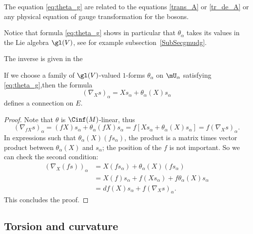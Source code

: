 \begin{normaltext}
    The equation \eqref{eq:theta_g} are related to the equations \eqref{trans_A} or \eqref{tr_de_A} or any physical equation of gauge transformation for the bosons.
\end{normaltext}

\begin{normaltext}
    Notice that formula \eqref{eq:theta_g} shows in particular that $\theta_{\alpha}$ takes its values in the Lie algebra $\gl(V)$, see for example subsection~\ref{SubSecgmudg}.
\end{normaltext}

The inverse is given in the
\begin{proposition}	\label{Propformconnve}
If we choose a family of $\gl(V)$-valued $1$-forms $\theta_{\alpha}$ on $\mU_{\alpha}$ satisfying \eqref{eq:theta_g},then the formula
\[
  (\nabla_Xs)_{\alpha}=Xs_{\alpha}+\theta_{\alpha}(X)s_{\alpha}
\]
defines a connection on $E$.\label{prop:thet_conn_F}
\end{proposition}

\begin{proof}
Note that $\theta$ is $\Cinf(M)$-linear, thus
\begin{equation}
  (\nabla_{fX}s)_{\alpha}=(fX)s_{\alpha}+\theta_{\alpha}(fX)s_{\alpha}
                        =f[ Xs_{\alpha}+\theta_{\alpha}(X)s_{\alpha} ]
			=f(\nabla_Xs)_{\alpha}.
\end{equation}
In expressions such that $\theta_{\alpha}(X)(fs_{\alpha})$, the product is a matrix times vector product between $\theta_{\alpha}(X)$ and $s_{\alpha}$; the position of the $f$ is not important. So we can check the second condition:
\begin{equation}
\begin{split}
(\nabla_X(fs))_{\alpha}&=X(fs_{\alpha})+\theta_{\alpha}(X)(fs_{\alpha}) \\
                     &=X(f)s_{\alpha}+f(Xs_{\alpha})+f\theta_{\alpha}(X)s_{\alpha}\\
		     &=df(X)s_{\alpha}+f(\nabla_Xs)_{\alpha}.
\end{split}
\end{equation}
This concludes the proof.
\end{proof}


\subsection{Torsion and curvature}

